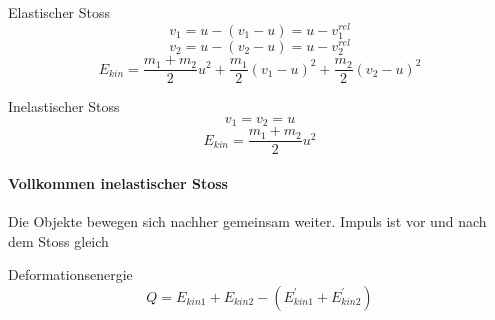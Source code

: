 Elastischer Stoss
$$ v_{1} = u - (v_{1} -u) = u - v_{1}^{rel} $$
$$ v_{2} = u - (v_{2} -u) = u - v_{2}^{rel} $$
$$ E_{kin} = \frac{m_{1}+m_{2}}{2}u^2+\frac{m_{1}}{2}(v_{1}-u)^2+\frac{m_{2}}{2}(v_{2}-u)^2 $$

Inelastischer Stoss
$$ v_{1}=v_{2}=u $$
$$ E_{kin} = \frac{m_{1}+m_{2}}{2}u^2$$

\paragraph{Vollkommen inelastischer Stoss}
Die Objekte bewegen sich nachher gemeinsam weiter. Impuls ist vor und nach dem Stoss gleich

Deformationsenergie
$$ Q = E_{kin1} + E_{kin2} - (E_{kin1}^{\prime}  + E_{kin2}^{\prime})  $$